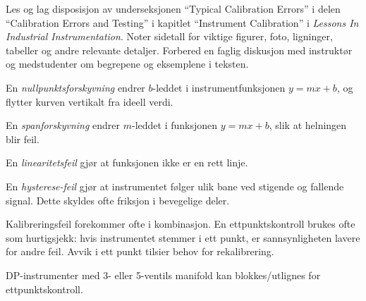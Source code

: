 

Les og lag disposisjon av underseksjonen ``Typical Calibration Errors'' i delen ``Calibration Errors and Testing'' i kapitlet ``Instrument Calibration'' i {\it Lessons In Industrial Instrumentation}. Noter sidetall for viktige figurer, foto, ligninger, tabeller og andre relevante detaljer. Forbered en faglig diskusjon med instruktør og medstudenter om begrepene og eksemplene i teksten.







 






En {\it nullpunktsforskyvning} endrer $b$-leddet i instrumentfunksjonen $y = mx + b$, og flytter kurven vertikalt fra ideell verdi.

\vskip 10pt

En {\it spanforskyvning} endrer $m$-leddet i funksjonen $y = mx + b$, slik at helningen blir feil.

\vskip 10pt

En {\it linearitetsfeil} gjør at funksjonen ikke er en rett linje.

\vskip 10pt

En {\it hysterese-feil} gjør at instrumentet følger ulik bane ved stigende og fallende signal. Dette skyldes ofte friksjon i bevegelige deler.

\vskip 10pt

Kalibreringsfeil forekommer ofte i kombinasjon. En ettpunktskontroll brukes ofte som hurtigsjekk: hvis instrumentet stemmer i ett punkt, er sannsynligheten lavere for andre feil. Avvik i ett punkt tilsier behov for rekalibrering.

\vskip 10pt

DP-instrumenter med 3- eller 5-ventils manifold kan blokkes/utlignes for ettpunktskontroll.




